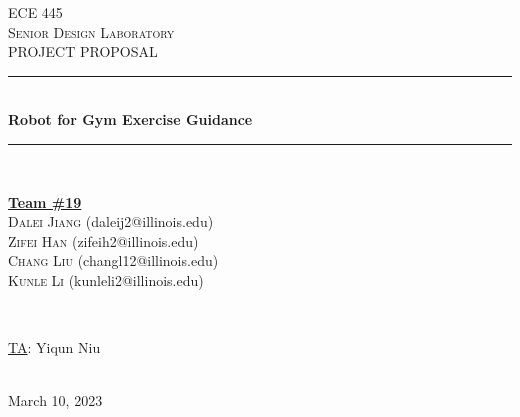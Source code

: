 \documentclass[12pt]{article}
\begin{document}
\begin{titlepage}
\newcommand{\HRule}{\rule{\linewidth}{0.1mm}} 
\center %
 
\textsc{\Large ECE 445}\\[0.5cm] %
\textsc{\large Senior Design Laboratory}\\[0.5cm] %
\textsc{\Large PROJECT PROPOSAL }\\[0.5cm] %

\HRule \\[0.5cm]
\huge \textbf{Robot for Gym Exercise Guidance} %
\HRule \\[2cm]
 
\begin{minipage}{0.5\textwidth}
    \begin{center} \large
        \underline{\textbf{Team \#19}} \\ \medskip
        \textsc{Dalei Jiang} (daleij2@illinois.edu) \\
        \textsc{Zifei Han} (zifeih2@illinois.edu) \\
        \textsc{Chang Liu} (changl12@illinois.edu) \\
        \textsc{Kunle Li} (kunleli2@illinois.edu) \\
    \end{center}
\end{minipage} \\[1.5cm]

\begin{minipage}{0.5\textwidth}
    \begin{center}
        \large
        \underline{TA}: Yiqun Niu
    \end{center}
\end{minipage} \\[1cm]

{\large March 10, 2023} %

\vfill %

\end{titlepage}
\clearpage
\tableofcontents
\end{document}
